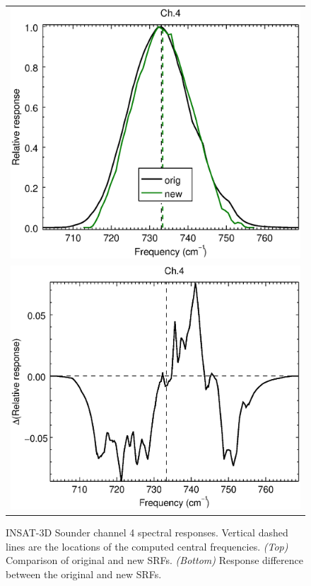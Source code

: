 \begin{figure}[H]
  \centering
  \begin{tabular}{c}
    \includegraphics[scale=0.55]{graphics/sndr/srf/sndr_insat3d-4.eps} \\
    \includegraphics[scale=0.55]{graphics/sndr/srf/sndr_insat3d-4.difference.eps}
  \end{tabular}
  \caption{INSAT-3D Sounder channel 4 spectral responses. Vertical dashed lines are the locations of the computed central frequencies. \emph{(Top)} Comparison of original and new SRFs. \emph{(Bottom)} Response difference between the original and new SRFs.}
  \label{fig:sndr_ch4}
\end{figure}


